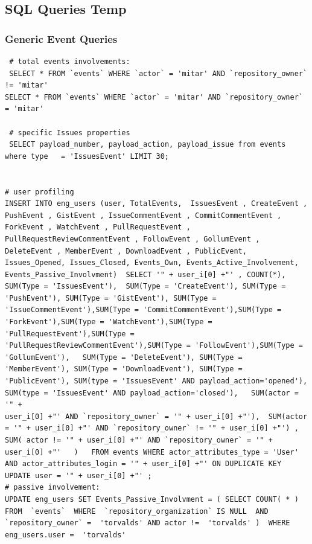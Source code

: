 \documentclass[a4paper,10pt]{article}
\begin{document}
\subsection{SQL Queries Temp}


\subsubsection{Generic Event Queries}
\begin{lstlisting}
 # total events involvements:
 SELECT * FROM `events` WHERE `actor` = 'mitar' AND `repository_owner` != 'mitar'
SELECT * FROM `events` WHERE `actor` = 'mitar' AND `repository_owner` = 'mitar'

 # specific Issues properties
 SELECT payload_number, payload_action, payload_issue from events where type   = 'IssuesEvent' LIMIT 30;


# user profiling
INSERT INTO eng_users (user, TotalEvents,  IssuesEvent , CreateEvent , PushEvent , GistEvent , IssueCommentEvent , CommitCommentEvent , ForkEvent , WatchEvent , PullRequestEvent , PullRequestReviewCommentEvent , FollowEvent , GollumEvent , DeleteEvent , MemberEvent , DownloadEvent , PublicEvent, Issues_Opened, Issues_Closed, Events_Own, Events_Active_Involvement, Events_Passive_Involvment)  SELECT '" + user_i[0] +"' , COUNT(*),  SUM(Type = 'IssuesEvent'),  SUM(Type = 'CreateEvent'), SUM(Type = 'PushEvent'), SUM(Type = 'GistEvent'), SUM(Type = 'IssueCommentEvent'),SUM(Type = 'CommitCommentEvent'),SUM(Type = 'ForkEvent'),SUM(Type = 'WatchEvent'),SUM(Type = 'PullRequestEvent'),SUM(Type = 'PullRequestReviewCommentEvent'),SUM(Type = 'FollowEvent'),SUM(Type = 'GollumEvent'),   SUM(Type = 'DeleteEvent'), SUM(Type = 'MemberEvent'), SUM(Type = 'DownloadEvent'), SUM(Type = 'PublicEvent'), SUM(type = 'IssuesEvent' AND payload_action='opened'), SUM(type = 'IssuesEvent' AND payload_action='closed'),   SUM(actor = '" + 
user_i[0] +"' AND `repository_owner` = '" + user_i[0] +"'),  SUM(actor = '" + user_i[0] +"' AND `repository_owner` != '" + user_i[0] +"') , SUM( actor != '" + user_i[0] +"' AND `repository_owner` = '" + user_i[0] +"'   )   FROM events WHERE actor_attributes_type = 'User' AND actor_attributes_login = '" + user_i[0] +"' ON DUPLICATE KEY UPDATE user = '" + user_i[0] +"' ;
# passive involvement:
UPDATE eng_users SET Events_Passive_Involvment = ( SELECT COUNT( * )  FROM  `events`  WHERE  `repository_organization` IS NULL  AND   `repository_owner` =  'torvalds' AND actor !=  'torvalds' )  WHERE eng_users.user =  'torvalds'
\end{lstlisting}
\end{document}
